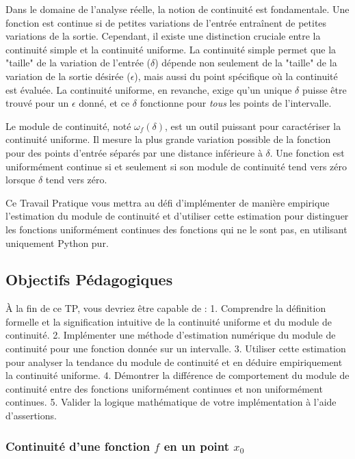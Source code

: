 \documentclass[12pt,a4paper]{report}
\begin{document}
Dans le domaine de l'analyse réelle, la notion de continuité est fondamentale. Une fonction est continue si de petites variations de l'entrée entraînent de petites variations de la sortie. Cependant, il existe une distinction cruciale entre la continuité simple et la continuité uniforme. La continuité simple permet que la "taille" de la variation de l'entrée ($\delta$) dépende non seulement de la "taille" de la variation de la sortie désirée ($\epsilon$), mais aussi du point spécifique où la continuité est évaluée. La continuité uniforme, en revanche, exige qu'un unique $\delta$ puisse être trouvé pour un $\epsilon$ donné, et ce $\delta$ fonctionne pour \textit{tous} les points de l'intervalle.

Le module de continuité, noté $\omega_f(\delta)$, est un outil puissant pour caractériser la continuité uniforme. Il mesure la plus grande variation possible de la fonction pour des points d'entrée séparés par une distance inférieure à $\delta$. Une fonction est uniformément continue si et seulement si son module de continuité tend vers zéro lorsque $\delta$ tend vers zéro.

Ce Travail Pratique vous mettra au défi d'implémenter de manière empirique l'estimation du module de continuité et d'utiliser cette estimation pour distinguer les fonctions uniformément continues des fonctions qui ne le sont pas, en utilisant uniquement Python pur.

\subsection{Objectifs Pédagogiques}

À la fin de ce TP, vous devriez être capable de :
1.  Comprendre la définition formelle et la signification intuitive de la continuité uniforme et du module de continuité.
2.  Implémenter une méthode d'estimation numérique du module de continuité pour une fonction donnée sur un intervalle.
3.  Utiliser cette estimation pour analyser la tendance du module de continuité et en déduire empiriquement la continuité uniforme.
4.  Démontrer la différence de comportement du module de continuité entre des fonctions uniformément continues et non uniformément continues.
5.  Valider la logique mathématique de votre implémentation à l'aide d'assertions.



\subsubsection{Continuité d'une fonction $f$ en un point $x_0$}
\end{document}
